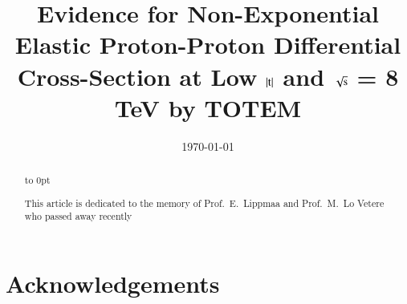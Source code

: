 \documentclass[3p,onecolumn,12pt,times,longtitle]{elsarticle}
\begin{document}
\begin{frontmatter}

\title{Evidence for Non-Exponential Elastic Proton-Proton Differential Cross-Section at Low $|\hbox{t}|$ and $\sqrt{\hbox{s}}$ = 8 TeV by TOTEM}


\date{\today}

\begin{abstract}

\vbox to 0pt{%
	\vskip-73mm
	\centerline{\footnotesize This article is dedicated to the memory of Prof.~E.~Lippmaa and Prof.~M.~Lo Vetere who passed away recently}%
	\vss
}
\end{abstract}


\end{frontmatter}















\section*{Acknowledgements}



\begin{thebibliography}{99}

\end{thebibliography}
\end{document}
